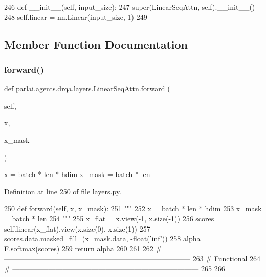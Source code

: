 \begin{DoxyCode}
246     \textcolor{keyword}{def }\_\_init\_\_(self, input\_size):
247         super(LinearSeqAttn, self).\_\_init\_\_()
248         self.linear = nn.Linear(input\_size, 1)
249 
\end{DoxyCode}


\subsection{Member Function Documentation}
\mbox{\label{classparlai_1_1agents_1_1drqa_1_1layers_1_1LinearSeqAttn_adae548d437f9b26ca9d928989e80a3ad}} 
\subsubsection{\texorpdfstring{forward()}{forward()}}
{\footnotesize\ttfamily def parlai.\+agents.\+drqa.\+layers.\+Linear\+Seq\+Attn.\+forward (\begin{DoxyParamCaption}\item[{}]{self,  }\item[{}]{x,  }\item[{}]{x\+\_\+mask }\end{DoxyParamCaption})}

\begin{DoxyVerb}x = batch * len * hdim
x_mask = batch * len
\end{DoxyVerb}
 

Definition at line 250 of file layers.\+py.


\begin{DoxyCode}
250     \textcolor{keyword}{def }forward(self, x, x\_mask):
251         \textcolor{stringliteral}{"""}
252 \textcolor{stringliteral}{        x = batch * len * hdim}
253 \textcolor{stringliteral}{        x\_mask = batch * len}
254 \textcolor{stringliteral}{        """}
255         x\_flat = x.view(-1, x.size(-1))
256         scores = self.linear(x\_flat).view(x.size(0), x.size(1))
257         scores.data.masked\_fill\_(x\_mask.data, -\hyperlink{namespaceprojects_1_1controllable__dialogue_1_1make__control__dataset_aa2b7207688c641dbc094ab44eca27113}{float}(\textcolor{stringliteral}{'inf'}))
258         alpha = F.softmax(scores)
259         \textcolor{keywordflow}{return} alpha
260 
261 
262 \textcolor{comment}{# ------------------------------------------------------------------------------}
263 \textcolor{comment}{# Functional}
264 \textcolor{comment}{# ------------------------------------------------------------------------------}
265 
266 
\end{DoxyCode}


